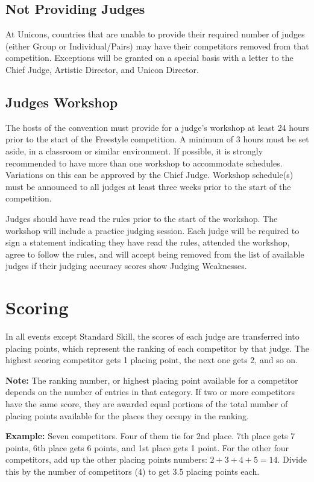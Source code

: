 \subsection{Not Providing Judges}
At Unicons, countries that are unable to provide their required number of judges (either Group or Individual/Pairs) may have their competitors removed from that competition.
Exceptions will be granted on a special basis with a letter to the Chief Judge, Artistic Director, and Unicon Director.

\subsection{Judges Workshop}
The hosts of the convention must provide for a judge's workshop at least 24 hours prior to the start of the Freestyle competition.
A minimum of 3 hours must be set aside, in a classroom or similar environment.
If possible, it is strongly recommended to have more than one workshop to accommodate schedules.
Variations on this can be approved by the Chief Judge.
Workshop schedule(s) must be announced to all judges at least three weeks prior to the start of the competition.

Judges should have read the rules prior to the start of the workshop.
The workshop will include a practice judging session.
Each judge will be required to sign a statement indicating they have read the rules, attended the workshop, agree to follow the rules, and will accept being removed from the list of available judges if their judging accuracy scores show Judging Weaknesses.

\section{Scoring}
In all events except Standard Skill, the scores of each judge are transferred into placing points, which represent the ranking of each competitor by that judge.
The highest scoring competitor gets 1 placing point, the next one gets 2, and so on.

\textbf{Note:} The ranking number, or highest placing point available for a competitor depends on the number of entries in that category.
If two or more competitors have the same score, they are awarded equal portions of the total number of placing points available for the places they occupy in the ranking.

\textbf{Example:} Seven competitors.
Four of them tie for 2nd place.
7th place gets 7 points, 6th place gets 6 points, and 1st place gets 1 point.
For the other four competitors, add up the other placing points numbers: $2+3+4+5=14$.
Divide this by the number of competitors (4) to get 3.5 placing points each.

